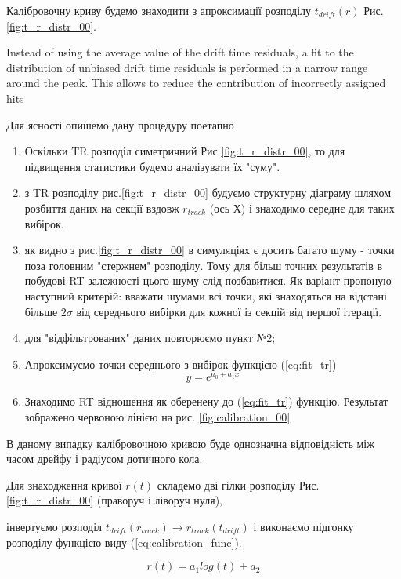 \documentclass[]{article}
\begin{document}
	Калібровочну криву будемо знаходити з апроксимації розподілу $t_{drift}(r)$ Рис.\ref{fig:t_r_distr_00}.
	
	
	Instead of using the average value of the drift time residuals, a fit to the distribution
of unbiased drift time residuals is performed in a narrow range around
the peak. This allows to reduce the contribution of incorrectly assigned hits

	Для ясності опишемо дану процедуру поетапно
	\begin{enumerate}
	\item Оскільки TR розподіл симетричний Рис \ref{fig:t_r_distr_00}, то для підвищення статистики будемо аналізувати їх "суму".
	\item з TR розподілу рис.\ref{fig:t_r_distr_00} будуємо структурну діаграму шляхом розбиття даних на секції вздовж $r_{track}$ (ось Х) і знаходимо середнє для таких вибірок.
	\item як видно з рис.\ref{fig:t_r_distr_00} в симуляціях є досить багато шуму - точки поза головним "стержнем" розподілу. Тому для більш точних результатів в побудові RT залежності цього шуму слід позбавитися. Як варіант пропоную наступний критерій: вважати шумами всі точки, які знаходяться на відстані більше $2 \sigma $ від середнього вибірки для кожної із секцій від першої ітерації.
	\item для "відфільтрованих" даних повторюємо пункт №2;
	\item Апроксимуємо точки середнього з вибірок функцією (\ref{eq:fit_tr})
	\begin{equation}
		y = e^{a_0 +a_1x}
		\label{eq:fit_tr}
	\end{equation}
	\item Знаходимо RT відношення як оберенену до (\ref{eq:fit_tr})  функцію. Результат зображено червоною лінією на рис. \ref{fig:calibration_00}
	\end{enumerate}
	
	
	В даному випадку калібровочною кривою буде однозначна відповідність між часом дрейфу і радіусом дотичного кола.
	
	Для знаходження кривої $r(t)$ складемо дві гілки розподілу Рис. \ref{fig:t_r_distr_00} (праворуч і ліворуч нуля), 
	
	
	 інвертуємо розподіл $t_{drift}(r_{track}) \longrightarrow r_{track}(t_{drift})$ і виконаємо підгонку розподілу функцією виду (\ref{eq:calibration_func}).
	
	\begin{equation}
		\label{eq:calibration_func}
		r(t) = a_1 log(t) + a_2
	\end{equation}
	
\end{document}
